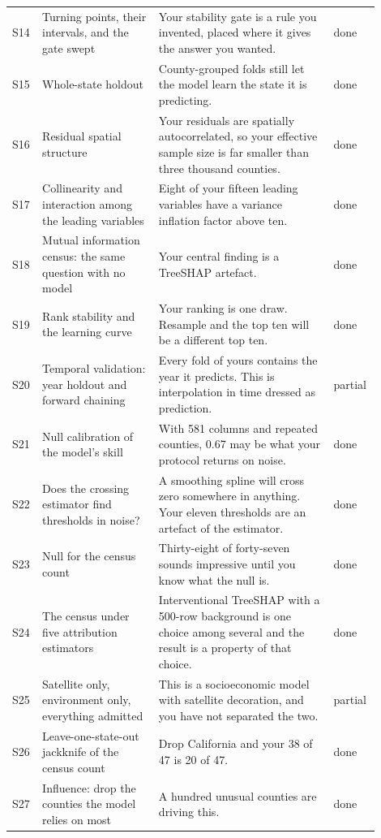 \begin{longtable}{p{0.05\linewidth}p{0.30\linewidth}p{0.45\linewidth}p{0.10\linewidth}}
 S14 & Turning points, their intervals, and the gate swept & Your stability gate is a rule you invented, placed where it gives the answer you wanted. & done \\
 S15 & Whole-state holdout & County-grouped folds still let the model learn the state it is predicting. & done \\
 S16 & Residual spatial structure & Your residuals are spatially autocorrelated, so your effective sample size is far smaller than three thousand counties. & done \\
 S17 & Collinearity and interaction among the leading variables & Eight of your fifteen leading variables have a variance inflation factor above ten. & done \\
 S18 & Mutual information census: the same question with no model & Your central finding is a TreeSHAP artefact. & done \\
 S19 & Rank stability and the learning curve & Your ranking is one draw. Resample and the top ten will be a different top ten. & done \\
 S20 & Temporal validation: year holdout and forward chaining & Every fold of yours contains the year it predicts. This is interpolation in time dressed as prediction. & partial \\
 S21 & Null calibration of the model's skill & With 581 columns and repeated counties, 0.67 may be what your protocol returns on noise. & done \\
 S22 & Does the crossing estimator find thresholds in noise? & A smoothing spline will cross zero somewhere in anything. Your eleven thresholds are an artefact of the estimator. & done \\
 S23 & Null for the census count & Thirty-eight of forty-seven sounds impressive until you know what the null is. & done \\
 S24 & The census under five attribution estimators & Interventional TreeSHAP with a 500-row background is one choice among several and the result is a property of that choice. & done \\
 S25 & Satellite only, environment only, everything admitted & This is a socioeconomic model with satellite decoration, and you have not separated the two. & partial \\
 S26 & Leave-one-state-out jackknife of the census count & Drop California and your 38 of 47 is 20 of 47. & done \\
 S27 & Influence: drop the counties the model relies on most & A hundred unusual counties are driving this. & done \\

\end{longtable}
